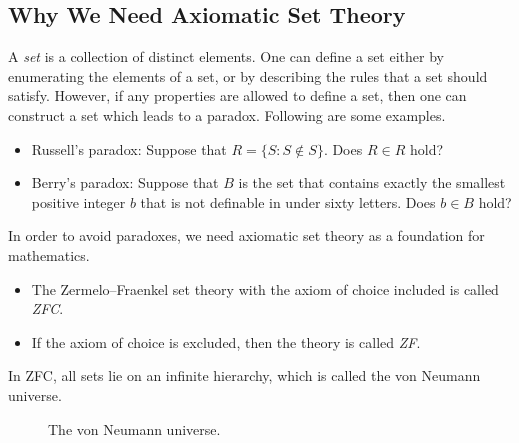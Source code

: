 \documentclass[11pt]{article}
\DeclareMathOperator{\pow}{Pow}
\begin{document}
\subsection{Why We Need Axiomatic Set Theory}
A \emph{set} is a collection of distinct elements.
One can define a set either by enumerating the elements of a set, or by describing the rules that a set should satisfy.
However, if any properties are allowed to define a set, then one can construct a set which leads to a paradox.
Following are some examples.

\begin{itemize}
  \item Russell's paradox: Suppose that $R = \{S: S \notin S\}$. Does $R \in R$ hold?
  \item Berry's paradox: Suppose that $B$ is the set that contains exactly the smallest positive integer $b$ that is not definable in under sixty letters. Does $b \in B$ hold?
\end{itemize}
%
In order to avoid paradoxes, we need axiomatic set theory as a foundation for mathematics.

\begin{itemize}
  \item The Zermelo--Fraenkel set theory with the axiom of choice included is called \emph{ZFC}.
  \item If the axiom of choice is excluded, then the theory is called \emph{ZF}.
\end{itemize}
%
In ZFC, all sets lie on an infinite hierarchy, which is called the von Neumann universe.

\begin{figure}[h]
  \centering
  \caption{The von Neumann universe.}
\end{figure}
\end{document}
